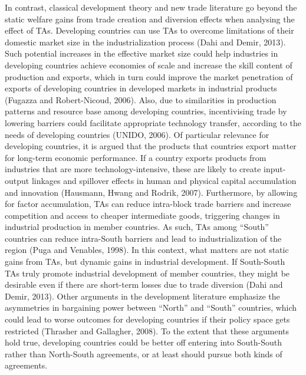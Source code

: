In contrast, classical development theory and new trade literature go
beyond the static welfare gains from trade creation and diversion
effects when analysing the effect of TAs. Developing countries can use
TAs to overcome limitations of their domestic market size in the
industrialization process (Dahi and Demir, 2013). Such potential
increases in the effective market size could help industries in
developing countries achieve economies of scale and increase the skill
content of production and exports, which in turn could improve the
market penetration of exports of developing countries in developed
markets in industrial products (Fugazza and Robert-Nicoud, 2006). Also,
due to similarities in production patterns and resource base among
developing countries, incentivising trade by lowering barriers could
facilitate appropriate technology transfer, according to the needs of
developing countries (UNIDO, 2006). Of particular relevance for
developing countries, it is argued that the products that countries
export matter for long-term economic performance. If a country exports
products from industries that are more technology-intensive, these are
likely to create input-output linkages and spillover effects in human
and physical capital accumulation and innovation (Hausmann, Hwang and
Rodrik, 2007). Furthermore, by allowing for factor accumulation, TAs can
reduce intra-block trade barriers and increase competition and access to
cheaper intermediate goods, triggering changes in industrial production
in member countries. As such, TAs among ``South'' countries can reduce
intra-South barriers and lead to industrialization of the region (Puga
and Venables, 1998). In this context, what matters are not static gains
from TAs, but dynamic gains in industrial development. If South-South
TAs truly promote industrial development of member countries, they might
be desirable even if there are short-term losses due to trade diversion
(Dahi and Demir, 2013). Other arguments in the development literature
emphasize the asymmetries in bargaining power between ``North'' and
``South'' countries, which could lead to worse outcomes for developing
countries if their policy space gets restricted (Thrasher and Gallagher,
2008). To the extent that these arguments hold true, developing
countries could be better off entering into South-South rather than
North-South agreements, or at least should pursue both kinds of
agreements.